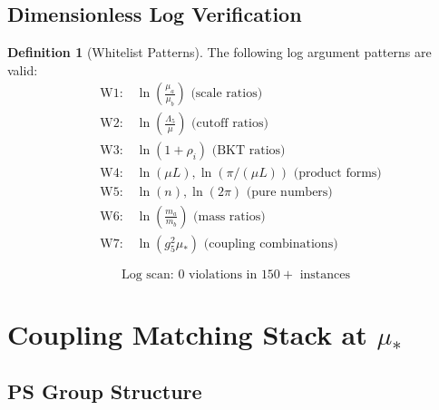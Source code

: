 \documentclass[11pt,a4paper]{article}
\theoremstyle{definition}
\newtheorem{definition}{Definition}[section]
\begin{document}
\subsection{Dimensionless Log Verification}
\label{subsec:log_verify}

\begin{definition}[Whitelist Patterns]
\label{def:whitelist}
The following log argument patterns are valid:
\begin{align}
\label{eq:W1}
&\text{W1:} \quad \ln\left(\frac{\mu_a}{\mu_b}\right) \text{ (scale ratios)} \\
\label{eq:W2}
&\text{W2:} \quad \ln\left(\frac{\Lambda_5}{\mu}\right) \text{ (cutoff ratios)} \\
\label{eq:W3}
&\text{W3:} \quad \ln(1 + \rho_i) \text{ (BKT ratios)} \\
\label{eq:W4}
&\text{W4:} \quad \ln(\mu L), \ln(\pi/(\mu L)) \text{ (product forms)} \\
\label{eq:W5}
&\text{W5:} \quad \ln(n), \ln(2\pi) \text{ (pure numbers)} \\
\label{eq:W6}
&\text{W6:} \quad \ln\left(\frac{m_a}{m_b}\right) \text{ (mass ratios)} \\
\label{eq:W7}
&\text{W7:} \quad \ln(g_5^2 \mu_*) \text{ (coupling combinations)}
\end{align}
\end{definition}

\begin{equation}
\label{eq:log_scan_result}
\text{Log scan: } 0 \text{ violations in } 150+ \text{ instances}
\end{equation}

\section{Coupling Matching Stack at $\mu_*$}
\label{sec:coupling}

\subsection{PS Group Structure}
\label{subsec:ps_group}
\end{document}
